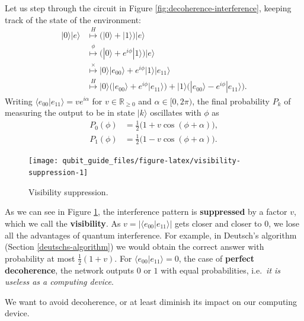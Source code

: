 \documentclass[fleqn,a4paper]{article}
\newenvironment{idea}{\everypar{\setlength{\parindent}{1.5em}}}{}
\theoremstyle{definition}
\theoremstyle{definition}
\theoremstyle{definition}
\theoremstyle{definition}
\theoremstyle{remark}
\begin{document}
Let us step through the circuit in Figure \ref{fig:decoherence-interference}, keeping track of the state of the environment:
\[
  \begin{aligned}
    |0\rangle|e\rangle
    & \overset{H}{\longmapsto} \Big( |0\rangle + |1\rangle \Big) |e\rangle
  \\& \overset{\phi}{\longmapsto} \Big( |0\rangle + e^{i\phi}|1\rangle \Big) |e\rangle
  \\& \overset{\times}{\longmapsto} |0\rangle|e_{00}\rangle + e^{i\phi}|1\rangle|e_{11}\rangle
  \\& \overset{H}{\longmapsto} |0\rangle\Big( |e_{00}\rangle + e^{i\phi}|e_{11}\rangle \Big) + |1\rangle\Big( |e_{00}\rangle - e^{i\phi}|e_{11}\rangle \Big).
  \end{aligned}
\]
Writing \(\langle e_{00}|e_{11}\rangle=ve^{i\alpha}\) for \(v\in\mathbb{R}_{\geqslant 0}\) and \(\alpha\in[0,2\pi)\), the final probability \(P_k\) of measuring the output to be in state \(|k\rangle\) oscillates with \(\phi\) as
\[
  \begin{aligned}
    P_{0}(\phi) &= \frac{1}{2}\big(1 + v\cos(\phi + \alpha)\big),
  \\P_{1}(\phi) &= \frac{1}{2}\big(1 - v\cos(\phi + \alpha)\big).
  \end{aligned}
\]

\begin{figure}[H]

{\centering \texttt{[image: qubit\_guide\_files/figure-latex/visibility-suppression-1]} 

}

\caption{Visibility suppression.}\label{fig:visibility-suppression}
\end{figure}

As we can see in Figure \ref{fig:visibility-suppression}, the interference pattern is \textbf{suppressed} by a factor \(v\), which we call the \textbf{visibility}.
As \(v=|\langle e_{00}|e_{11}\rangle|\) gets closer and closer to \(0\), we lose all the advantages of quantum interference.
For example, in Deutsch's algorithm (Section \ref{deutschs-algorithm}) we would obtain the correct answer with probability at most \(\frac{1}{2}(1+v)\).
For \(\langle e_{00}|e_{11}\rangle = 0\), the case of \textbf{perfect decoherence}, the network outputs \(0\) or \(1\) with equal probabilities, i.e.~\emph{it is useless as a computing device}.

\begin{idea}
We want to avoid decoherence, or at least diminish its impact on our computing device.

\end{idea}
\end{document}
